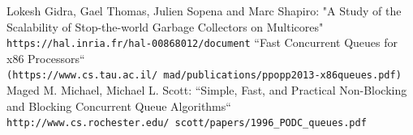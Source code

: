\documentclass{article}
\begin{document}
  \medskip
  \newpage

  \begin{thebibliography}{9}
      Lokesh Gidra, Gael Thomas, Julien Sopena and Marc Shapiro: "A Study of the Scalability of Stop-the-world Garbage Collectors on Multicores"
      \\\texttt{https://hal.inria.fr/hal-00868012/document}
      ``Fast Concurrent Queues for x86 Processors``
      \\\texttt{(https://www.cs.tau.ac.il/~mad/publications/ppopp2013-x86queues.pdf)}
	    Maged M. Michael, Michael L. Scott: ``Simple, Fast, and Practical Non-Blocking and Blocking Concurrent Queue Algorithms``
      \\\texttt{http://www.cs.rochester.edu/~scott/papers/1996\_PODC\_queues.pdf}
  \end{thebibliography}
\end{document}
